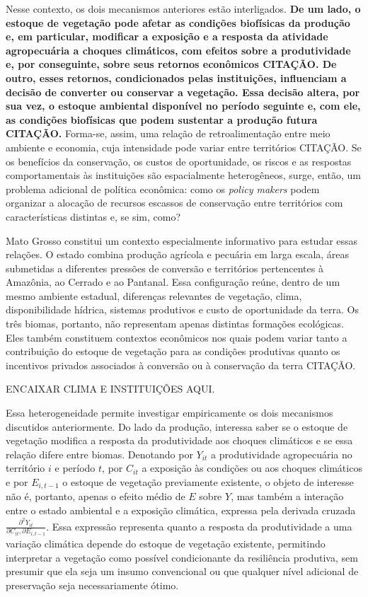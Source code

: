 Nesse contexto, os dois mecanismos anteriores estão interligados. \textbf{De um lado, o estoque de vegetação pode afetar as condições biofísicas da produção e, em particular, modificar a exposição e a resposta da atividade agropecuária a choques climáticos, com efeitos sobre a produtividade e, por conseguinte, sobre seus retornos econômicos {CITAÇÃO}. De outro, esses retornos, condicionados pelas instituições, influenciam a decisão de converter ou conservar a vegetação. Essa decisão altera, por sua vez, o estoque ambiental disponível no período seguinte e, com ele, as condições biofísicas que podem sustentar a produção futura {CITAÇÃO}.} Forma-se, assim, uma relação de retroalimentação entre meio ambiente e economia, cuja intensidade pode variar entre territórios {CITAÇÃO}. Se os benefícios da conservação, os custos de oportunidade, os riscos e as respostas comportamentais às instituições são espacialmente heterogêneos, surge, então, um problema adicional de política econômica: como os \textit{policy makers} podem organizar a alocação de recursos escassos de conservação entre territórios com características distintas e, se sim, como?

Mato Grosso constitui um contexto especialmente informativo para estudar essas relações. O estado combina produção agrícola e pecuária em larga escala, áreas submetidas a diferentes pressões de conversão e territórios pertencentes à Amazônia, ao Cerrado e ao Pantanal. Essa configuração reúne, dentro de um mesmo ambiente estadual, diferenças relevantes de vegetação, clima, disponibilidade hídrica, sistemas produtivos e custo de oportunidade da terra. Os três biomas, portanto, não representam apenas distintas formações ecológicas. Eles também constituem contextos econômicos nos quais podem variar tanto a contribuição do estoque de vegetação para as condições produtivas quanto os incentivos privados associados à conversão ou à conservação da terra {CITAÇÃO}.

ENCAIXAR CLIMA E INSTITUIÇÕES AQUI.

Essa heterogeneidade permite investigar empiricamente os dois mecanismos discutidos anteriormente. Do lado da produção, interessa saber se o estoque de vegetação modifica a resposta da produtividade aos choques climáticos e se essa relação difere entre biomas. Denotando por $Y_{it}$ a produtividade agropecuária no território $i$ e período $t$, por $C_{it}$ a exposição às condições ou aos choques climáticos e por $E_{i,t-1}$ o estoque de vegetação previamente existente, o objeto de interesse não é, portanto, apenas o efeito médio de $E$ sobre $Y$, mas também a interação entre o estado ambiental e a exposição climática, expressa pela derivada cruzada $\frac{\partial^2 Y_{it}}{\partial C_{it},\partial E_{i,t-1}}$. Essa expressão representa quanto a resposta da produtividade a uma variação climática depende do estoque de vegetação existente, permitindo interpretar a vegetação como possível condicionante da resiliência produtiva, sem presumir que ela seja um insumo convencional ou que qualquer nível adicional de preservação seja necessariamente ótimo.

